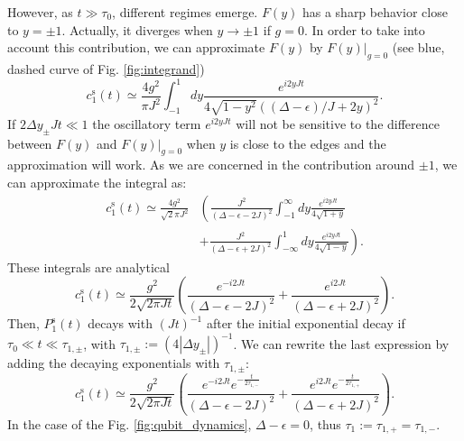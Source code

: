 \documentclass[aps,pra,twocolumn,floatfix,superscriptaddress]{revtex4-1}%
\begin{document}
However, as $t\gg \tau_0$, different regimes emerge. $F(y)$ has a sharp behavior close to $y=\pm 1$. Actually, it diverges when $y\to\pm 1$ if $g=0$. In order to take into account this contribution, we can approximate $F(y)$ by $F(y)|_{g=0}$ (see blue, dashed curve of Fig. \ref{fig:integrand})
\begin{equation}
c_1^\text{s}(t)\simeq \frac{4g^2}{\pi J^2}\int_{-1}^1 dy \frac{e^{i2yJt}}{4\sqrt{1-y^2}((\Delta-\epsilon)/J+2y)^2}.
\end{equation}
If $2\Delta y_\pm Jt\ll 1$ the oscillatory term $e^{i2yJt}$ will not be sensitive to the difference between $F(y)$ and $F(y)|_{g=0}$ when $y$ is close to the edges and the approximation will work. As we are concerned in the contribution around $\pm 1$, we can approximate the integral as:
\begin{align}
c_1^\text{s}(t)  \simeq \frac{4g^2}{\sqrt{2}\pi J^2}&\left(\frac{J^2}{(\Delta-\epsilon-2J)^2}\int_{-1}^\infty dy \frac{e^{i2yJt}}{4\sqrt{1+y}}\right. \\
& \left.+ \frac{J^2}{(\Delta-\epsilon+2J)^2}\int_{-\infty}^1 dy \frac{e^{i2yJt}}{4\sqrt{1-y}}\right).\nonumber
\end{align}
These integrals are analytical
\begin{equation}
c_1^\text{s}(t)\simeq \frac{g^2}{2\sqrt{2\pi Jt}}\left(\frac{e^{-i2Jt}}{(\Delta-\epsilon-2J)^2}+\frac{e^{i2Jt}}{(\Delta-\epsilon+2J)^2}\right).\label{eq:csc_1}
\end{equation}
Then, $P_1^\text{s}(t)$ decays with $(Jt)^{-1}$ after the initial exponential decay if $\tau_0\ll t\ll \tau_{1,\pm}$, with $\tau_{1,\pm}:=(4|\Delta y_\pm|)^{-1}$. We can rewrite the last expression by adding the decaying exponentials with $\tau_{1,\pm}$:
\begin{equation}
c_1^\text{s}(t)\simeq \frac{g^2}{2\sqrt{2\pi Jt}}\left(\frac{e^{-i2Jt}e^{-\frac{t}{2\tau_{1,-}}}}{(\Delta-\epsilon-2J)^2}+\frac{e^{i2Jt}e^{-\frac{t}{2\tau_{1,+}}}}{(\Delta-\epsilon+2J)^2}\right).
\end{equation}
In the case of the Fig. \ref{fig:qubit_dynamics}, $\Delta-\epsilon=0$, thus $\tau_1:=\tau_{1,+}=\tau_{1,-}$.
\end{document}
